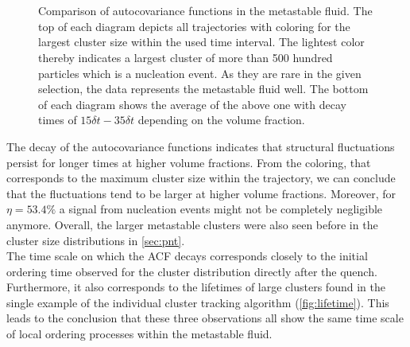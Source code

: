 \begin{figure}[h]
\begin{center}
 \hspace{0.5cm}
 \\
 \hspace{0.5cm}
 \\
\caption[Autocovariance functions of largest cluster in the metastable fluid]{Comparison of autocovariance functions in the metastable fluid. The top of each diagram depicts all trajectories with coloring for the largest cluster size within the used time interval. The lightest color thereby indicates a largest cluster of more than 500 hundred particles which is a nucleation event. As they are rare in the given selection, the data represents the metastable fluid well. The bottom of each diagram shows the average of the above one with decay times of $ 15 \delta t- 35 \delta t$ depending on the volume fraction. }
\label{fig:acf}
\end{center}
\end{figure}

The decay of the autocovariance functions indicates that structural fluctuations persist for longer times at higher volume fractions. From the coloring, that corresponds to the maximum cluster size within the trajectory, we can conclude that the fluctuations tend to be larger at higher volume fractions. Moreover, for $\eta=53.4\%$ a signal from nucleation events might not be completely negligible anymore. Overall, the larger metastable clusters were also seen before in the cluster size distributions in \autoref{sec:pnt}.\\
The time scale on which the ACF decays corresponds closely to the initial ordering time observed for the cluster distribution directly after the quench. Furthermore, it also corresponds to the lifetimes of large clusters found in the single example of the individual cluster tracking algorithm (\autoref{fig:lifetime}). This leads to the conclusion that these three observations all show the same time scale of local ordering processes within the metastable fluid. 

